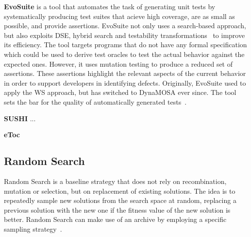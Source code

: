 \documentclass{article}
\begin{document}
\textbf{EvoSuite} is a tool that automates the task of generating unit tests by systematically producing test suites that acieve high coverage, are as small as possible, and provide assertions. EvoSuite not only uses a search-based approach,  but also exploits \ac{DSE}, hybrid search and testability transformations~\cite{Harman2004} to improve its efficiency. The tool targets programs that do not have any formal specification which could be used to derive test oracles to test the actual behavior against the expected ones. However, it uses mutation testing to produce a reduced set of assertions. These assertions highlight the relevant aspects of the current behavior in order to support developers in identifying defects. Originally, EvoSuite used to apply the \ac{WS} approach, but has switched to \ac{DynaMOSA} ever since. The tool sets the bar for the quality of automatically generated tests~\cite{Vogl2021,Panichella2020,Campos2019,Fraser2018,Fraser2016,Fraser2017}.

\textbf{SUSHI} ...

\textbf{eToc}

\subsection{Random Search}

Random Search is a baseline strategy that does not rely on recombination, mutation or selection, but on replacement of existing solutions. The idea is to repeatedly sample new solutions from the search space at random, replacing a previous solution with the new one if the fitness value of the new solution is better. Random Search can make use of an archive by employing a specific sampling strategy~\cite{Campos2017}.

\end{document}
